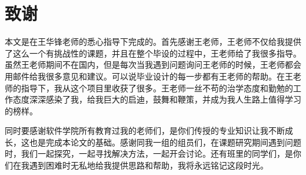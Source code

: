 \chapter*{致谢}
本文是在王华锋老师的悉心指导下完成的。首先感谢王老师，王老师不仅给我提供了这么一个有挑战性的课题，并且在整个毕设的过程中，王老师给了我很多指导。虽然王老师期间不在国内，但是每次当我遇到问题询问王老师的时候，王老师都会用邮件给我很多意见和建议。可以说毕业设计的每一步都有王老师的帮助。在王老师的指导下，我从这个项目里收获了很多。王老师一丝不苟的治学态度和勤勉的工作态度深深感染了我，给我巨大的启迪，鼓舞和鞭策，并成为我人生路上值得学习的榜样。

同时要感谢软件学院所有教育过我的老师们，是你们传授的专业知识让我不断成长，这也是完成本论文的基础。感谢同我一组的组员们，在课题研究期间遇到问题时，我们一起探究，一起寻找解决方法，一起开会讨论。还有班里的同学们，是你们在我遇到困难时无私地给我提供思路和帮助，我将永远铭记这段时光。
\cleardoublepage
